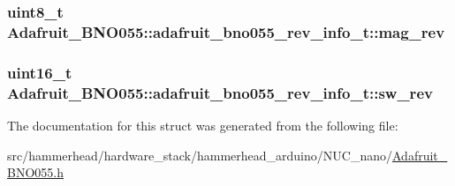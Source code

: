 \subsubsection[{\texorpdfstring{mag\+\_\+rev}{mag_rev}}]{\setlength{\rightskip}{0pt plus 5cm}uint8\+\_\+t Adafruit\+\_\+\+B\+N\+O055\+::adafruit\+\_\+bno055\+\_\+rev\+\_\+info\+\_\+t\+::mag\+\_\+rev}\hypertarget{structAdafruit__BNO055_1_1adafruit__bno055__rev__info__t_ae6ce4bc850654ade8d9978a1354e0532}{}\label{structAdafruit__BNO055_1_1adafruit__bno055__rev__info__t_ae6ce4bc850654ade8d9978a1354e0532}
\subsubsection[{\texorpdfstring{sw\+\_\+rev}{sw_rev}}]{\setlength{\rightskip}{0pt plus 5cm}uint16\+\_\+t Adafruit\+\_\+\+B\+N\+O055\+::adafruit\+\_\+bno055\+\_\+rev\+\_\+info\+\_\+t\+::sw\+\_\+rev}\hypertarget{structAdafruit__BNO055_1_1adafruit__bno055__rev__info__t_a2699cc1023a026c17db56f6e2fe289ac}{}\label{structAdafruit__BNO055_1_1adafruit__bno055__rev__info__t_a2699cc1023a026c17db56f6e2fe289ac}


The documentation for this struct was generated from the following file\+:\begin{DoxyCompactItemize}
\item 
src/hammerhead/hardware\+\_\+stack/hammerhead\+\_\+arduino/\+N\+U\+C\+\_\+nano/\hyperlink{Adafruit__BNO055_8h}{Adafruit\+\_\+\+B\+N\+O055.\+h}\end{DoxyCompactItemize}
